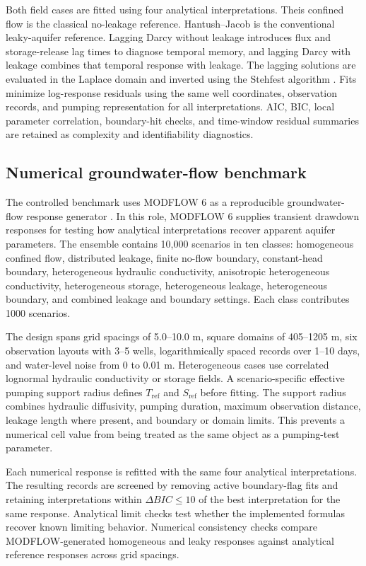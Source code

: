 \documentclass[a4paper,fleqn]{cas-sc}
\begin{document}
Both field cases are fitted using four analytical interpretations. Theis confined flow is the classical no-leakage reference. Hantush--Jacob is the conventional leaky-aquifer reference. Lagging Darcy without leakage introduces flux and storage-release lag times to diagnose temporal memory, and lagging Darcy with leakage combines that temporal response with leakage. The lagging solutions are evaluated in the Laplace domain and inverted using the Stehfest algorithm \citep{stehfest1970}. Fits minimize log-response residuals using the same well coordinates, observation records, and pumping representation for all interpretations. AIC, BIC, local parameter correlation, boundary-hit checks, and time-window residual summaries are retained as complexity and identifiability diagnostics.

\subsection{Numerical groundwater-flow benchmark}

The controlled benchmark uses MODFLOW 6 as a reproducible groundwater-flow response generator \citep{langevin2017,bakker2016}. In this role, MODFLOW 6 supplies transient drawdown responses for testing how analytical interpretations recover apparent aquifer parameters. The ensemble contains 10,000 scenarios in ten classes: homogeneous confined flow, distributed leakage, finite no-flow boundary, constant-head boundary, heterogeneous hydraulic conductivity, anisotropic heterogeneous conductivity, heterogeneous storage, heterogeneous leakage, heterogeneous boundary, and combined leakage and boundary settings. Each class contributes 1000 scenarios.

The design spans grid spacings of 5.0--10.0 m, square domains of 405--1205 m, six observation layouts with 3--5 wells, logarithmically spaced records over 1--10 days, and water-level noise from 0 to 0.01 m. Heterogeneous cases use correlated lognormal hydraulic conductivity or storage fields. A scenario-specific effective pumping support radius defines $T_{\mathrm{ref}}$ and $S_{\mathrm{ref}}$ before fitting. The support radius combines hydraulic diffusivity, pumping duration, maximum observation distance, leakage length where present, and boundary or domain limits. This prevents a numerical cell value from being treated as the same object as a pumping-test parameter.

Each numerical response is refitted with the same four analytical interpretations. The resulting records are screened by removing active boundary-flag fits and retaining interpretations within $\Delta BIC \leq 10$ of the best interpretation for the same response. Analytical limit checks test whether the implemented formulas recover known limiting behavior. Numerical consistency checks compare MODFLOW-generated homogeneous and leaky responses against analytical reference responses across grid spacings.
\end{document}
